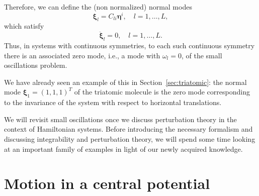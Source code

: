 \documentclass[english,fontsize=11pt,paper=a5,oneside]{scrbook}
\theoremstyle{definition}
\newenvironment{remark}
  {\pushQED{\qed}\renewcommand{\qedsymbol}{$\lozenge$}\remarkx}
  {\popQED\endremarkx}
\begin{document}
Therefore, we can define the (non normalized) normal modes
\begin{equation}
  \bm{\xi}_l = C_{li} \bm{\eta}^i, \quad l=1,\ldots, L,
\end{equation}
which satisfy
\begin{equation}
  \ddot{\bm{\xi}}_l = 0, \quad l=1,\ldots, L.
\end{equation}
Thus, in systems with continuous symmetries, to each such continuous symmetry there is an associated zero mode, i.e., a mode with $\omega_l = 0$, of the small oscillations problem.

\begin{remark}
  We have already seen an example of this in Section~\ref{sec:triatomic}: the normal mode $\bm{\xi}_1=(1,1,1)^T$ of the triatomic molecule is the zero mode corresponding to the invariance of the system with respect to horizontal translations.
\end{remark}
\medskip

We will revisit small oscillations once we discuss perturbation theory in the context of Hamiltonian systems. Before introducing the necessary formalism and discussing integrability and perturbation theory, we will spend some time looking at an important family of examples in light of our newly acquired knowledge.

\section{Motion in a central potential}
\end{document}
